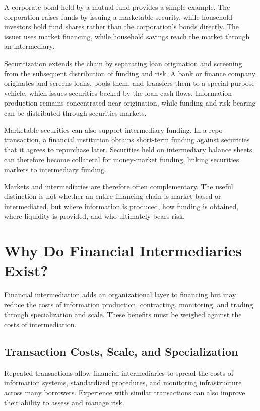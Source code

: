 A corporate bond held by a mutual fund provides a simple example. The corporation raises funds by issuing a marketable security, while household investors hold fund shares rather than the corporation's bonds directly. The issuer uses market financing, while household savings reach the market through an intermediary.

Securitization extends the chain by separating loan origination and screening from the subsequent distribution of funding and risk. A bank or finance company originates and screens loans, pools them, and transfers them to a special-purpose vehicle, which issues securities backed by the loan cash flows. Information production remains concentrated near origination, while funding and risk bearing can be distributed through securities markets.

Marketable securities can also support intermediary funding. In a repo transaction, a financial institution obtains short-term funding against securities that it agrees to repurchase later. Securities held on intermediary balance sheets can therefore become collateral for money-market funding, linking securities markets to intermediary funding.

Markets and intermediaries are therefore often complementary. The useful distinction is not whether an entire financing chain is market based or intermediated, but where information is produced, how funding is obtained, where liquidity is provided, and who ultimately bears risk.

\section{Why Do Financial Intermediaries Exist?}

Financial intermediation adds an organizational layer to financing but may reduce the costs of information production, contracting, monitoring, and trading through specialization and scale. These benefits must be weighed against the costs of intermediation.

\subsection{Transaction Costs, Scale, and Specialization}

Repeated transactions allow financial intermediaries to spread the costs of information systems, standardized procedures, and monitoring infrastructure across many borrowers. Experience with similar transactions can also improve their ability to assess and manage risk.

